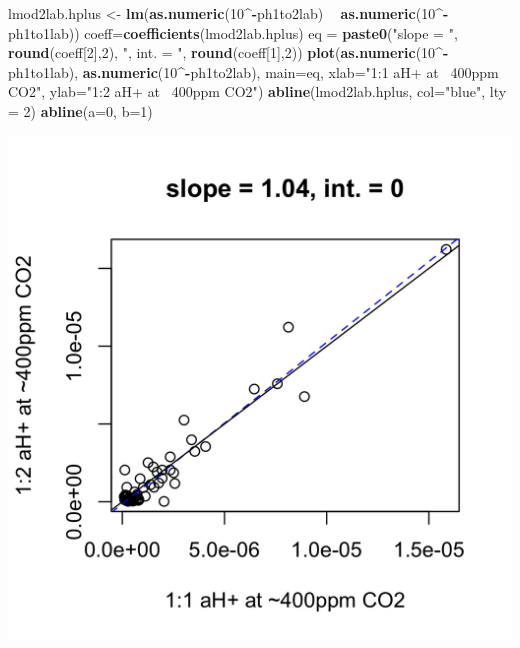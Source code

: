 \documentclass[]{article}
\newenvironment{Shaded}{\begin{snugshade}}{\end{snugshade}}
\newcommand{\DataTypeTok}[1]{\textcolor[rgb]{0.13,0.29,0.53}{#1}}
\newcommand{\DecValTok}[1]{\textcolor[rgb]{0.00,0.00,0.81}{#1}}
\newcommand{\KeywordTok}[1]{\textcolor[rgb]{0.13,0.29,0.53}{\textbf{#1}}}
\newcommand{\NormalTok}[1]{#1}
\newcommand{\OperatorTok}[1]{\textcolor[rgb]{0.81,0.36,0.00}{\textbf{#1}}}
\newcommand{\StringTok}[1]{\textcolor[rgb]{0.31,0.60,0.02}{#1}}
\begin{document}
\begin{Shaded}
\begin{Highlighting}[]
\NormalTok{lmod2lab.hplus <-}\StringTok{ }\KeywordTok{lm}\NormalTok{(}\KeywordTok{as.numeric}\NormalTok{(}\DecValTok{10}\OperatorTok{^-}\NormalTok{ph1to2lab) }\OperatorTok{~}\StringTok{ }\KeywordTok{as.numeric}\NormalTok{(}\DecValTok{10}\OperatorTok{^-}\NormalTok{ph1to1lab))}
\NormalTok{coeff=}\KeywordTok{coefficients}\NormalTok{(lmod2lab.hplus)}
\NormalTok{eq =}\StringTok{ }\KeywordTok{paste0}\NormalTok{(}\StringTok{"slope = "}\NormalTok{, }\KeywordTok{round}\NormalTok{(coeff[}\DecValTok{2}\NormalTok{],}\DecValTok{2}\NormalTok{), }\StringTok{", int. = "}\NormalTok{, }\KeywordTok{round}\NormalTok{(coeff[}\DecValTok{1}\NormalTok{],}\DecValTok{2}\NormalTok{))}
\KeywordTok{plot}\NormalTok{(}\KeywordTok{as.numeric}\NormalTok{(}\DecValTok{10}\OperatorTok{^-}\NormalTok{ph1to1lab), }\KeywordTok{as.numeric}\NormalTok{(}\DecValTok{10}\OperatorTok{^-}\NormalTok{ph1to2lab), }\DataTypeTok{main=}\NormalTok{eq,}
   \DataTypeTok{xlab=}\StringTok{"1:1 aH+ at ~400ppm CO2"}\NormalTok{, }\DataTypeTok{ylab=}\StringTok{"1:2 aH+ at ~400ppm CO2"}\NormalTok{)}
\KeywordTok{abline}\NormalTok{(lmod2lab.hplus, }\DataTypeTok{col=}\StringTok{"blue"}\NormalTok{, }\DataTypeTok{lty =} \DecValTok{2}\NormalTok{)}
\KeywordTok{abline}\NormalTok{(}\DataTypeTok{a=}\DecValTok{0}\NormalTok{, }\DataTypeTok{b=}\DecValTok{1}\NormalTok{)}
\end{Highlighting}
\end{Shaded}

\includegraphics{output-rmd/whitman-figure-request-2-lab-hplus-spooner-1.png}
\end{document}
